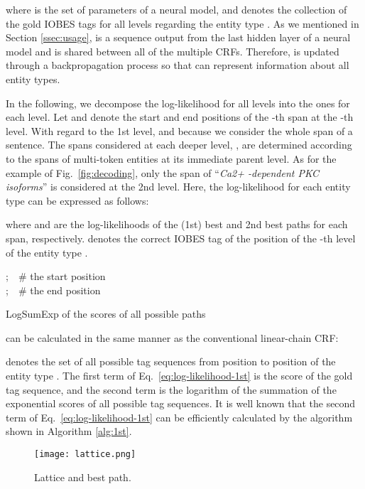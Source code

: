 \documentclass[11pt,a4paper]{article}
\def\figref#1{Fig.~\ref{#1}}
\def\equref#1{Eq.~\ref{#1}}
\begin{document}
where  is the set of parameters of a neural model, and  denotes the collection of the gold IOBES tags for all levels regarding the entity type .
As we mentioned in Section \ref{ssec:usage},  is a sequence output from the last hidden layer of a neural model and is shared between all of the multiple CRFs.
Therefore,  is updated through a backpropagation process so that  can represent information about all entity types.

In the following, we decompose the log-likelihood for all levels into the ones for each level.
Let  and  denote the start and end positions of the -th span at the -th level.
With regard to the 1st level,  and  because we consider the whole span of a sentence.
The spans considered at each deeper level, , are determined according to the spans of multi-token entities at its immediate parent level.
As for the example of \figref{fig:decoding}, only the span of ``{\it Ca2+ -dependent PKC isoforms}'' is considered at the 2nd level.
Here, the log-likelihood for each entity type can be expressed as follows:

where  and  are the log-likelihoods of the (1st) best and 2nd best paths for each span, respectively.
 denotes the correct IOBES tag of the position  of the -th level of the entity type .

\begin{algorithm}[t]
\small
\;
;\ \ \# the start position \\
;\ \ \# the end position \\
\ForEach{}{
  \;
}
\For{; ; }{
  \ForEach{}{
    \ForEach{}{
      \;
    }
  }
  \ForEach{}{
    \;
  }
}
\ForEach{}{
  \;
}
\KwRet \;
\caption{LogSumExp of the scores of all possible paths}\label{alg:1st}
\end{algorithm}

  can be calculated in the same manner as the conventional linear-chain CRF:

 denotes the set of all possible tag sequences from position  to position  of the entity type .
The first term of \equref{eq:log-likelihood-1st} is the score of the gold tag sequence, and the second term is the logarithm of the summation of the exponential scores of all possible tag sequences.
It is well known that the second term of \equref{eq:log-likelihood-1st} can be efficiently calculated by the algorithm shown in Algorithm \ref{alg:1st}.

\begin{figure}[t]
\centering
\texttt{[image: lattice.png]}
\caption{Lattice and best path.}
\label{fig:best-path}
\end{figure}
\end{document}
